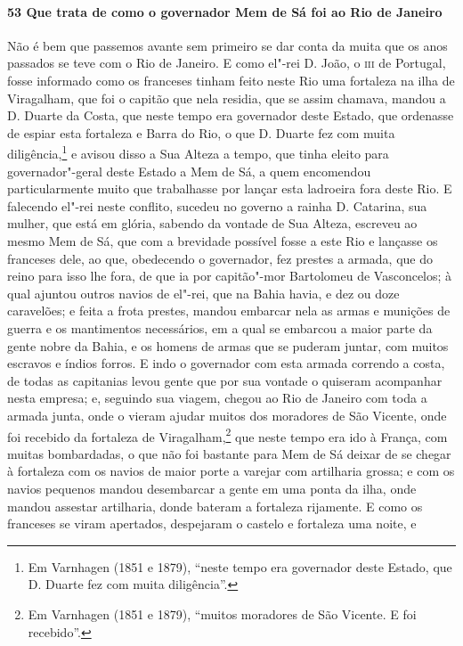 \paragraph{53 Que trata de como o governador Mem de Sá foi ao Rio de Janeiro}

Não é bem que passemos avante sem primeiro se dar conta da muita que os anos passados se
teve com o Rio de Janeiro. E como el"-rei D. João, o \textsc{iii} de Portugal, fosse
informado como os franceses tinham feito neste Rio uma fortaleza na ilha de Viragalham,
que foi o capitão que nela residia, que se assim chamava, mandou a D. Duarte da Costa, que
neste tempo era governador deste Estado, que ordenasse de espiar esta fortaleza e Barra do
Rio, o que D. Duarte fez com muita diligência,\footnote{ Em Varnhagen (1851 e 1879),
``neste tempo era governador deste Estado, que D. Duarte fez com muita diligência''.} e
avisou disso a Sua Alteza a tempo, que tinha eleito para governador"-geral deste Estado a
Mem de Sá, a quem encomendou particularmente muito que trabalhasse por lançar esta
ladroeira fora deste Rio. E falecendo el"-rei neste conflito, sucedeu no governo a rainha
D. Catarina, sua mulher, que está em glória, sabendo da vontade de Sua Alteza, escreveu ao
mesmo Mem de Sá, que com a brevidade possível fosse a este Rio e lançasse os franceses
dele, ao que, obedecendo o governador, fez prestes a armada, que do reino para isso lhe
fora, de que ia por capitão"-mor Bartolomeu de Vasconcelos; à qual ajuntou outros navios de
el"-rei, que na Bahia havia, e dez ou doze caravelões; e feita a frota prestes, mandou
embarcar nela as armas e munições de guerra e os mantimentos necessários, em a qual se
embarcou a maior parte da gente nobre da Bahia, e os homens de armas que se puderam
juntar, com muitos escravos e índios forros. E indo o governador com esta armada correndo
a costa, de todas as capitanias levou gente que por sua vontade o quiseram acompanhar
nesta empresa; e, seguindo sua viagem, chegou ao Rio de Janeiro com toda a armada junta,
onde o vieram ajudar muitos dos moradores de São Vicente, onde foi recebido da fortaleza
de Viragalham,\footnote{ Em Varnhagen (1851 e 1879), ``muitos moradores de São Vicente. E
foi recebido''.} que neste tempo era ido à França, com muitas bombardadas, o que não foi
bastante para Mem de Sá deixar de se chegar à fortaleza com os navios de maior porte a
varejar com artilharia grossa; e com os navios pequenos mandou desembarcar a gente em uma
ponta da ilha, onde mandou assestar artilharia, donde bateram a fortaleza rijamente. E
como os franceses se viram apertados, despejaram o castelo e fortaleza uma noite, e
